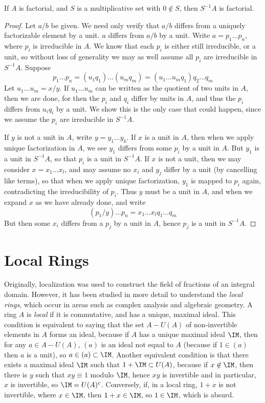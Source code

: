 \begin{theorem}
    If $A$ is factorial, and $S$ is a multiplicative set with $0 \not \in S$, then $S^{-1}A$ is factorial.
\end{theorem}
\begin{proof}
    Let $a/b$ be given. We need only verify that $a/b$ differs from a uniquely factorizable element by a unit. $a$ differs from $a/b$ by a unit. Write $a = p_1 \dots p_n$, where $p_i$ is irreducible in $A$. We know that each $p_i$ is either still irreducible, or a unit, so without loss of generality we may as well assume all $p_i$ are irreducible in $S^{-1}A$. Suppose
    \[ p_1 \dots p_n = (u_1 q_1) \dots (u_m q_m) = (u_1 \dots u_m q_1) q_2 \dots q_m \]
    Let $u_1 \dots u_m = x/y$. If $u_1 \dots u_m$ can be written as the quotient of two units in $A$, then we are done, for then the $p_i$ and $q_i$ differ by units in $A$, and thus the $p_i$ differs from $u_i q_i$ by a unit. We show this is the only case that could happen, since we assume the $p_i$ are irreducible in $S^{-1}A$.

    If $y$ is not a unit in $A$, write $y = y_1 \dots y_k$. If $x$ is a unit in $A$, then when we apply unique factorization in $A$, we see $y_1$ differs from some $p_i$ by a unit in $A$. But $y_1$ is a unit in $S^{-1}A$, so that $p_i$ is a unit in $S^{-1}A$. If $x$ is not a unit, then we may consider $x = x_1 \dots x_{l}$, and may assume no $x_i$ and $y_j$ differ by a unit (by cancelling like terms), so that when we apply unique factorization, $y_1$ is mapped to $p_i$ again, contradicting the irreducibility of $p_i$. Thus $y$ must be a unit in $A$, and when we expand $x$ as we have already done, and write
    \[ (p_1/y) \dots p_n = x_1 \dots x_{l} q_1 \dots q_m \]
    But then some $x_i$ differs from a $p_j$ by a unit in $A$, hence $p_j$ is a unit in $S^{-1}A$.
\end{proof}

\section{Local Rings}

Originally, localization was used to construct the field of fractions of an integral domain. However, it has been studied in more detail to understand the \emph{local rings}, which occur in areas such as complex analysis and algebraic geometry. A ring $A$ is \emph{local} if it is commutative, and has a unique, maximal ideal. This condition is equivalent to saying that the set $A - U(A)$ of non-invertible elements in $A$ forms an ideal, because if $A$ has a unique maximal ideal $\IM$, then for any $a \in A - U(A)$, $(a)$ is an ideal not equal to $A$ (because if $1 \in (a)$ then $a$ is a unit), so $a \in (a) \subset \IM$. Another equivalent condition is that there exists a maximal ideal $\IM$ such that $1 + \IM \subset U(A)$, because if $x \not \in \IM$, then there is $y$ such that $xy \equiv 1$ modulo $\IM$, hence $xy$ is invertible and in particular, $x$ is invertible, so $\IM = U(A)^c$. Conversely, if, in a local ring, $1 + x$ is not invertible, where $x \in \IM$, then $1 + x \in \IM$, so $1 \in \IM$, which is absurd.

